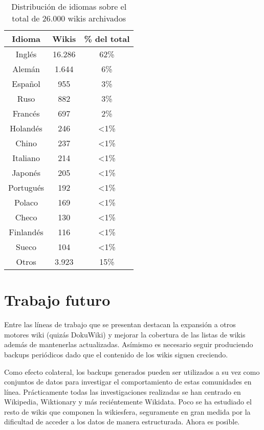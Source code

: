 \documentclass[14pt,twocolumn]{article}
\begin{document}
\begin{table}[]
\centering
\caption{Distribución de idiomas sobre el total de 26.000 wikis archivados}
\label{idiomas}
\begin{tabular}{|c|c|c|}
\hline
\multicolumn{1}{|c|}{\textbf{Idioma}} & 
\multicolumn{1}{|c|}{\textbf{Wikis}} & 
\multicolumn{1}{|c|}{\textbf{\% del total}} \\ \hline
	Inglés & 16.286 & 62\% \\ \hline
	Alemán & 1.644 & 6\% \\ \hline
	Español & 955 & 3\% \\ \hline
	Ruso & 882 & 3\% \\ \hline
	Francés & 697 & 2\% \\ \hline
	Holandés & 246 & \textless1\% \\ \hline
	Chino & 237 & \textless1\% \\ \hline
	Italiano & 214 & \textless1\% \\ \hline
	Japonés & 205 & \textless1\% \\ \hline
	Portugués & 192 & \textless1\% \\ \hline
	Polaco & 169 & \textless1\% \\ \hline
	Checo & 130 & \textless1\% \\ \hline
	Finlandés & 116 & \textless1\% \\ \hline
	Sueco & 104 & \textless1\% \\ \hline
	Otros & 3.923 & 15\% \\ \hline
\end{tabular}
\end{table}

\section{Trabajo futuro}

Entre las líneas de trabajo que se presentan destacan la expansión a otros motores wiki (quizás DokuWiki) y mejorar la cobertura de las listas de wikis además de mantenerlas actualizadas. Asímismo es necesario seguir produciendo backups periódicos dado que el contenido de los wikis siguen creciendo.

Como efecto colateral, los backups generados pueden ser utilizados a su vez como conjuntos de datos para investigar el comportamiento de estas comunidades en línea. Prácticamente todas las investigaciones realizadas se han centrado en Wikipedia, Wiktionary y más reciéntemente Wikidata. Poco se ha estudiado el resto de wikis que componen la wikiesfera, seguramente en gran medida por la dificultad de acceder a los datos de manera estructurada. Ahora es posible.
\end{document}
